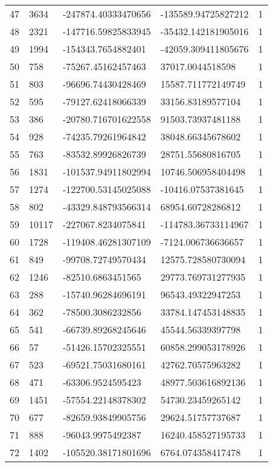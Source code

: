 \begin{longtable}{lllll}
    47 & 3634 & -247874.40333470656 & -135589.94725827212 & 1 \\
    48 & 2321 & -147716.59825833945 & -35432.142181905016 & 1 \\
    49 & 1994 & -154343.7654882401 & -42059.309411805676 & 1 \\
    50 & 758 & -75267.45162457463 & 37017.0044518598 & 1 \\
    51 & 803 & -96696.74430428469 & 15587.711772149749 & 1 \\
    52 & 595 & -79127.62418066339 & 33156.83189577104 & 1 \\
    53 & 386 & -20780.716701622558 & 91503.73937481188 & 1 \\
    54 & 928 & -74235.79261964842 & 38048.66345678602 & 1 \\
    55 & 763 & -83532.89926826739 & 28751.55680816705 & 1 \\
    56 & 1831 & -101537.94911802994 & 10746.506958404498 & 1 \\
    57 & 1274 & -122700.53145025088 & -10416.07537381645 & 1 \\
    58 & 802 & -43329.848793566314 & 68954.60728286812 & 1 \\
    59 & 10117 & -227067.8234075841 & -114783.36733114967 & 1 \\
    60 & 1728 & -119408.46281307109 & -7124.006736636657 & 1 \\
    61 & 849 & -99708.72749570434 & 12575.728580730094 & 1 \\
    62 & 1246 & -82510.6863451565 & 29773.769731277935 & 1 \\
    63 & 288 & -15740.96284696191 & 96543.49322947253 & 1 \\
    64 & 362 & -78500.3086232856 & 33784.147453148835 & 1 \\
    65 & 541 & -66739.89268245646 & 45544.56339397798 & 1 \\
    66 & 57 & -51426.15702325551 & 60858.299053178926 & 1 \\
    67 & 523 & -69521.75031680161 & 42762.70575963282 & 1 \\
    68 & 471 & -63306.9524595423 & 48977.503616892136 & 1 \\
    69 & 1451 & -57554.22148378302 & 54730.23459265142 & 1 \\
    70 & 677 & -82659.93849905756 & 29624.51757737687 & 1 \\
    71 & 888 & -96043.9975492387 & 16240.458527195733 & 1 \\
    72 & 1402 & -105520.38171801696 & 6764.074358417478 & 1 \\

\end{longtable}
